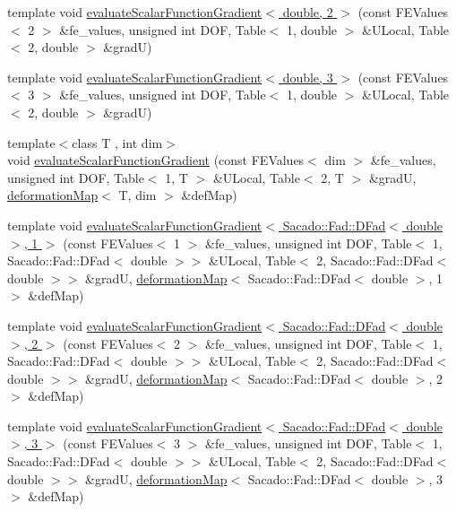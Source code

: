 \begin{DoxyCompactItemize}
\item 
template void \hyperlink{function_evaluations_8cc_aebfcd53aa3d6ed1aade3f0a3b404e790}{evaluate\-Scalar\-Function\-Gradient$<$ double, 2 $>$} (const F\-E\-Values$<$ 2 $>$ \&fe\-\_\-values, unsigned int D\-O\-F, Table$<$ 1, double $>$ \&U\-Local, Table$<$ 2, double $>$ \&grad\-U)
\item 
template void \hyperlink{function_evaluations_8cc_a9c4d97c0a964edc8d705a9086abc7a87}{evaluate\-Scalar\-Function\-Gradient$<$ double, 3 $>$} (const F\-E\-Values$<$ 3 $>$ \&fe\-\_\-values, unsigned int D\-O\-F, Table$<$ 1, double $>$ \&U\-Local, Table$<$ 2, double $>$ \&grad\-U)
\item 
{\footnotesize template$<$class T , int dim$>$ }\\void \hyperlink{group___evaluation_functions_gabeb71201e8213a7c7616cd8824617f73}{evaluate\-Scalar\-Function\-Gradient} (const F\-E\-Values$<$ dim $>$ \&fe\-\_\-values, unsigned int D\-O\-F, Table$<$ 1, T $>$ \&U\-Local, Table$<$ 2, T $>$ \&grad\-U, \hyperlink{structdeformation_map}{deformation\-Map}$<$ T, dim $>$ \&def\-Map)
\item 
template void \hyperlink{function_evaluations_8cc_a7a07a439fec6ad8cbb76757b9e0832ce}{evaluate\-Scalar\-Function\-Gradient$<$ Sacado\-::\-Fad\-::\-D\-Fad$<$ double $>$, 1 $>$} (const F\-E\-Values$<$ 1 $>$ \&fe\-\_\-values, unsigned int D\-O\-F, Table$<$ 1, Sacado\-::\-Fad\-::\-D\-Fad$<$ double $>$$>$ \&U\-Local, Table$<$ 2, Sacado\-::\-Fad\-::\-D\-Fad$<$ double $>$$>$ \&grad\-U, \hyperlink{structdeformation_map}{deformation\-Map}$<$ Sacado\-::\-Fad\-::\-D\-Fad$<$ double $>$, 1 $>$ \&def\-Map)
\item 
template void \hyperlink{function_evaluations_8cc_a9314f95484440c9c86bff06911c6d52e}{evaluate\-Scalar\-Function\-Gradient$<$ Sacado\-::\-Fad\-::\-D\-Fad$<$ double $>$, 2 $>$} (const F\-E\-Values$<$ 2 $>$ \&fe\-\_\-values, unsigned int D\-O\-F, Table$<$ 1, Sacado\-::\-Fad\-::\-D\-Fad$<$ double $>$$>$ \&U\-Local, Table$<$ 2, Sacado\-::\-Fad\-::\-D\-Fad$<$ double $>$$>$ \&grad\-U, \hyperlink{structdeformation_map}{deformation\-Map}$<$ Sacado\-::\-Fad\-::\-D\-Fad$<$ double $>$, 2 $>$ \&def\-Map)
\item 
template void \hyperlink{function_evaluations_8cc_aa5c93137a9a61bb5f455809ac3862e34}{evaluate\-Scalar\-Function\-Gradient$<$ Sacado\-::\-Fad\-::\-D\-Fad$<$ double $>$, 3 $>$} (const F\-E\-Values$<$ 3 $>$ \&fe\-\_\-values, unsigned int D\-O\-F, Table$<$ 1, Sacado\-::\-Fad\-::\-D\-Fad$<$ double $>$$>$ \&U\-Local, Table$<$ 2, Sacado\-::\-Fad\-::\-D\-Fad$<$ double $>$$>$ \&grad\-U, \hyperlink{structdeformation_map}{deformation\-Map}$<$ Sacado\-::\-Fad\-::\-D\-Fad$<$ double $>$, 3 $>$ \&def\-Map)

\end{DoxyCompactItemize}
